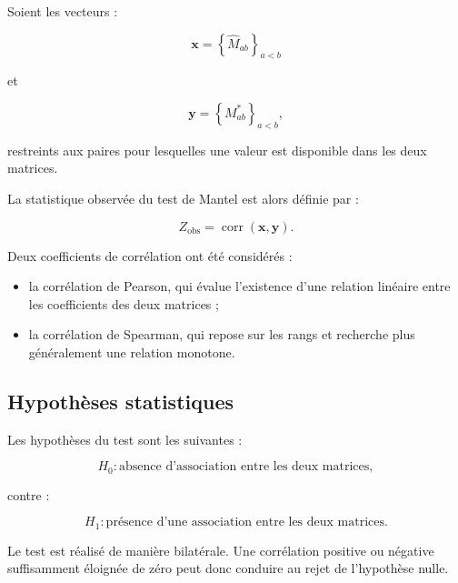 \documentclass[11pt,a4paper]{report}
\begin{document}
Soient les vecteurs :

\begin{equation}
    \mathbf{x}
    =
    \left\{
    \widehat{M}_{ab}
    \right\}_{a<b}
\end{equation}

et

\begin{equation}
    \mathbf{y}
    =
    \left\{
    M^*_{ab}
    \right\}_{a<b},
\end{equation}

restreints aux paires pour lesquelles une valeur est disponible dans
les deux matrices.

La statistique observée du test de Mantel est alors définie par :

\begin{equation}
    Z_{\mathrm{obs}}
    =
    \operatorname{corr}(\mathbf{x},\mathbf{y}).
\end{equation}

Deux coefficients de corrélation ont été considérés :

\begin{itemize}
    \item la corrélation de Pearson, qui évalue l'existence d'une
    relation linéaire entre les coefficients des deux matrices ;
    \item la corrélation de Spearman, qui repose sur les rangs et
    recherche plus généralement une relation monotone.
\end{itemize}


\subsection*{Hypothèses statistiques}

Les hypothèses du test sont les suivantes :

\begin{equation}
    H_0 :
    \text{absence d'association entre les deux matrices},
\end{equation}

contre :

\begin{equation}
    H_1 :
    \text{présence d'une association entre les deux matrices}.
\end{equation}

Le test est réalisé de manière bilatérale. Une corrélation positive ou
négative suffisamment éloignée de zéro peut donc conduire au rejet de
l'hypothèse nulle.
\end{document}
